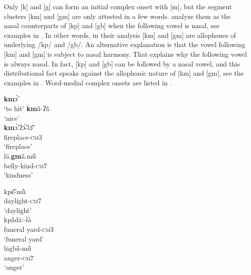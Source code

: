 \documentclass[output=paper]{langscibook}
\begin{document}
Only [k] and [g] can form an initial complex onset with [m], but the segment clusters [km] and [gm] are only attested in a few words. \citet{Herault1973} analyze them as the nasal counterparts of [kp] and [gb] when the following vowel is nasal, see examples in . In other words, in their analysis [km] and [gm] are allophones of underlying /kp/ and /gb/. An alternative explanation is that the vowel following [km] and [gm] is subject to nasal harmony. That explains why the following vowel is always nasal. In fact, [kp] and [gb] can be followed by a nasal vowel, and this distributional fact speaks against the allophonic nature of [km] and [gm], see the examples in . Word-medial complex onsets are listed in .


\begin{exe}\setlength{\multicolsep}{0pt}
    \ex \label{ex:traore:velarPlusNasalComplexOnset:13}
    \begin{multicols}{2}
    \begin{xlist}
        \ex \textbf{km}ɔ̃́ \\
            `to hit'
        \ex \textbf{km}ã̄-ʔã̄  \\
            `nice'\\
        \ex \gll \textbf{km}ɔ̃́.ʔɔ̃́-lɔ̃̄ \\
            fireplace-\textsc{cm}3\\
            \trans `fireplace'\\
        \ex \gll lā.\textbf{gm}ã̄.mũ̄  \\
            belly-kind-\textsc{cm}7\\
            \trans `kindness'\\
    \end{xlist}
    \end{multicols}
\end{exe} 

 \begin{exe}\setlength{\multicolsep}{0pt}
    \ex \label{ex:traore:14}
     \begin{multicols}{2}
        \begin{xlist}
            \ex \gll kpɛ̃̄-mũ̀   \\
                daylight-\textsc{cm}7\\
                \trans `daylight'\\
            \ex \gll kpã̀dàː-là\\
               {funeral yard-\textsc{cm}3}\\
              \trans `funeral yard'\\
             \ex \gll lāgbã̄-mũ̄ \\
                anger-\textsc{cm7}\\
                \trans `anger'\\
        \end{xlist}
     \end{multicols}
 \end{exe}
 
\end{document}
